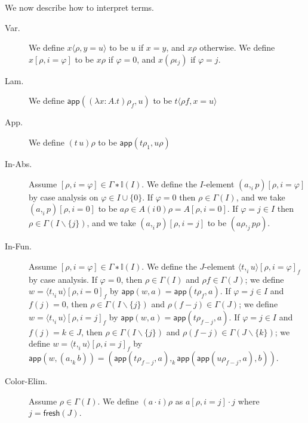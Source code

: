 \documentclass[english]{PaperTools/latex/entcs}
\theoremstyle{plain}
\theoremstyle{definition}
\theoremstyle{remark}
\newcommand\param[1]{\!\cdot\!#1}
\newcommand\fp[3]{⟨#2 ,_{#1} #3⟩}
\def\fresh#1{\mathsf{fresh}(#1)}
\def\app#1#2{\mathsf{app}(#1,#2)}
\begin{document}
\medskip
We now describe how to interpret terms.
\begin{description}
  \item[\sc Var.]
    We define $x⟨ρ,y=u⟩$ to be $u$ if $x = y$, and $xρ$ otherwise.
    We define $x[ρ,i=φ]$ to be $xρ$ if $φ = 0$, and
    $x(ρι_j)$ if $φ = j$.

  \item[\sc Lam.]
    We define $\app{(λ x:A.t)ρ_f}{u}$ to be $t⟨ρf,x=u⟩$

  \item[\sc App.]
    We define $(t\,u)ρ$ to be $\app{tρ_1}{uρ}$

  \item[\sc In-Abs.]
    Assume $[ρ,i=φ] ∈ Γ∗𝕀(I)$.  We define the $I$-element $(a ,_i p)[ρ,i=φ]$
    by case analysis on $φ ∈ I ∪ \{0\}$.
    If $φ = 0$ then $ρ ∈ Γ(I)$, and we take $(a ,_i p)[ρ,i=0]$ to be
    $aρ ∈ A(i\,0)ρ = A[ρ,i=0]$.
    If $φ = j ∈ I$ then $ρ ∈ Γ(I\backslash\{j\})$, and we take
    $(a ,_i p)[ρ,i=j]$ to be $(aρ ,_j pρ)$.

  \item[\sc In-Fun.]
    Assume $[ρ,i=φ] ∈ Γ∗𝕀(I)$.  We define the $J$-element ${\fp i t u}[ρ,i=φ]_f$
    by case analysis.
    If $φ = 0$, then $ρ ∈ Γ(I)$ and $ρf ∈ Γ(J)$; we define
    $w = {\fp i t u}[ρ,i=0]_f$ by $\app{w}{a} = \app{tρ_f}{a}$.
    If $φ = j ∈ I$ and $f(j) = 0$, then $ρ ∈ Γ(I\backslash\{j\})$ and $ρ(f-j) ∈ Γ(J)$;
    we define $w = {\fp i t u}[ρ,i=j]_f$ by $\app{w}{a} = \app{tρ_{f-j}}{a}$.
    If $φ = j ∈ I$ and $f(j) = k ∈ J$, then $ρ ∈ Γ(I\backslash\{j\})$ and $ρ(f-j) ∈ Γ(J\backslash\{k\})$;
    we define $w = {\fp i t u}[ρ,i=j]_f$ by
    $\app{w}{(a ,_k b)} = ( \app{tρ_{f-j}}{a} ,_k {\app{\app{uρ_{f-j}}{a}}{b}} )$.

  \item[\sc Color-Elim.]
    Assume $ρ ∈ Γ(I)$.  We define $(a \param i)ρ$ as
    $a[ρ,i=j]·j$ where $j = \fresh{J}$.
\end{description}
\end{document}

